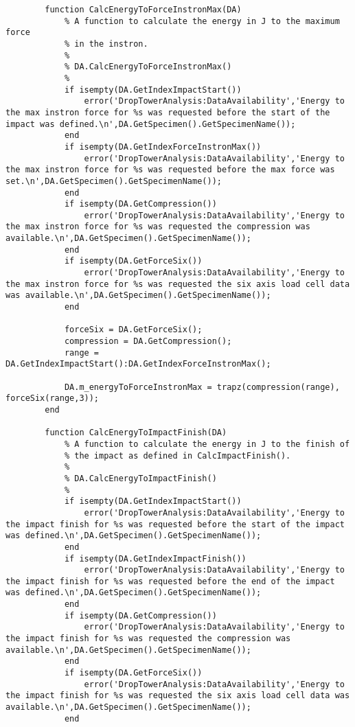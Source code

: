 \begin{lstlisting}
        function CalcEnergyToForceInstronMax(DA)
            % A function to calculate the energy in J to the maximum force
            % in the instron.
            %
            % DA.CalcEnergyToForceInstronMax()
            %
            if isempty(DA.GetIndexImpactStart())
                error('DropTowerAnalysis:DataAvailability','Energy to the max instron force for %s was requested before the start of the impact was defined.\n',DA.GetSpecimen().GetSpecimenName());
            end
            if isempty(DA.GetIndexForceInstronMax())
                error('DropTowerAnalysis:DataAvailability','Energy to the max instron force for %s was requested before the max force was set.\n',DA.GetSpecimen().GetSpecimenName());
            end
            if isempty(DA.GetCompression())
                error('DropTowerAnalysis:DataAvailability','Energy to the max instron force for %s was requested the compression was available.\n',DA.GetSpecimen().GetSpecimenName());
            end
            if isempty(DA.GetForceSix())
                error('DropTowerAnalysis:DataAvailability','Energy to the max instron force for %s was requested the six axis load cell data was available.\n',DA.GetSpecimen().GetSpecimenName());
            end
            
            forceSix = DA.GetForceSix();
            compression = DA.GetCompression();
            range = DA.GetIndexImpactStart():DA.GetIndexForceInstronMax();
            
            DA.m_energyToForceInstronMax = trapz(compression(range), forceSix(range,3));
        end
        
        function CalcEnergyToImpactFinish(DA)
            % A function to calculate the energy in J to the finish of 
            % the impact as defined in CalcImpactFinish().
            %
            % DA.CalcEnergyToImpactFinish()
            %
            if isempty(DA.GetIndexImpactStart())
                error('DropTowerAnalysis:DataAvailability','Energy to the impact finish for %s was requested before the start of the impact was defined.\n',DA.GetSpecimen().GetSpecimenName());
            end
            if isempty(DA.GetIndexImpactFinish())
                error('DropTowerAnalysis:DataAvailability','Energy to the impact finish for %s was requested before the end of the impact was defined.\n',DA.GetSpecimen().GetSpecimenName());
            end
            if isempty(DA.GetCompression())
                error('DropTowerAnalysis:DataAvailability','Energy to the impact finish for %s was requested the compression was available.\n',DA.GetSpecimen().GetSpecimenName());
            end
            if isempty(DA.GetForceSix())
                error('DropTowerAnalysis:DataAvailability','Energy to the impact finish for %s was requested the six axis load cell data was available.\n',DA.GetSpecimen().GetSpecimenName());
            end
            

\end{lstlisting}
